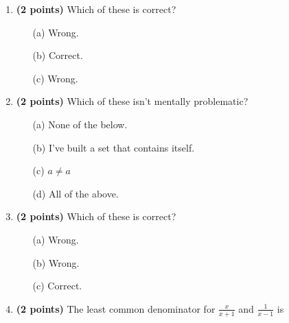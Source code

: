 \documentclass[12pt]{amsart}
\begin{document}
\newpage
\begin{enumerate}
\item {\bf (2 points)} 
 Which of these is correct?

\begin{minipage}[t]{1.0\linewidth}\begin{multicols}{3}\begin{itemize}\item[(a)]  Wrong. \item[(b)]  Correct. \item[(c)]  Wrong. \end{itemize}\end{multicols}\end{minipage} \vfill 
\item {\bf (2 points)} 
 Which of these isn't mentally problematic?

\begin{minipage}[t]{1.0\linewidth}\begin{itemize}\item[(a)]  None of the below.  \item[(b)]  I've built a set that contains itself. \item[(c)]  $a \neq a$ \item[(d)]   All of the above. \end{itemize}\end{minipage} \vfill 
\item {\bf (2 points)} 
 Which of these is correct?

\begin{minipage}[t]{1.0\linewidth}\begin{multicols}{3}\begin{itemize}\item[(a)]  Wrong. \item[(b)]  Wrong. \item[(c)]  Correct. \end{itemize}\end{multicols}\end{minipage} \vfill 
\item {\bf (2 points)} 
 The least common denominator for $\displaystyle \frac{x}{x+1}$ and $\displaystyle \frac{1}{x-1}$ is \vspace{.2cm}


\end{enumerate}
\end{document}
